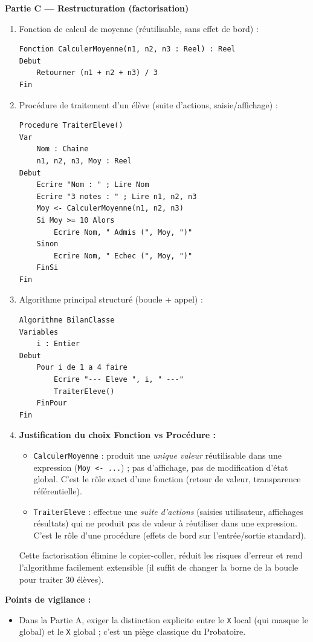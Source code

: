 \documentclass[11pt]{article}
\newcommand{\cle}[1]{{\popxbold\color{popdark}#1}}
\begin{document}
\begin{corrige}
\textbf{Partie C — Restructuration (factorisation)}
\begin{enumerate}
    \item Fonction de calcul de moyenne (réutilisable, sans effet de bord) :
\begin{lstlisting}
Fonction CalculerMoyenne(n1, n2, n3 : Reel) : Reel
Debut
    Retourner (n1 + n2 + n3) / 3
Fin
\end{lstlisting}
    \item Procédure de traitement d'un élève (suite d'actions, saisie/affichage) :
\begin{lstlisting}
Procedure TraiterEleve()
Var
    Nom : Chaine
    n1, n2, n3, Moy : Reel
Debut
    Ecrire "Nom : " ; Lire Nom
    Ecrire "3 notes : " ; Lire n1, n2, n3
    Moy <- CalculerMoyenne(n1, n2, n3)
    Si Moy >= 10 Alors
        Ecrire Nom, " Admis (", Moy, ")"
    Sinon
        Ecrire Nom, " Echec (", Moy, ")"
    FinSi
Fin
\end{lstlisting}
    \item Algorithme principal structuré (boucle + appel) :
\begin{lstlisting}
Algorithme BilanClasse
Variables
    i : Entier
Debut
    Pour i de 1 a 4 faire
        Ecrire "--- Eleve ", i, " ---"
        TraiterEleve()
    FinPour
Fin
\end{lstlisting}
    \item \textbf{Justification du choix Fonction vs Procédure :}
    \begin{itemize}
        \item \texttt{CalculerMoyenne} : produit une \emph{unique valeur} réutilisable dans une expression (\texttt{Moy <- ...}) ; pas d'affichage, pas de modification d'état global. C'est le rôle exact d'une \cle{fonction} (retour de valeur, transparence référentielle).
        \item \texttt{TraiterEleve} : effectue une \emph{suite d'actions} (saisies utilisateur, affichages résultats) qui ne produit pas de valeur à réutiliser dans une expression. C'est le rôle d'une \cle{procédure} (effets de bord sur l'entrée/sortie standard).
    \end{itemize}
    Cette factorisation élimine le copier-coller, réduit les risques d'erreur et rend l'algorithme facilement extensible (il suffit de changer la borne de la boucle pour traiter 30 élèves).
\end{enumerate}
\textbf{Points de vigilance :}
\begin{itemize}
    \item Dans la Partie A, exiger la distinction explicite entre le \texttt{X} local (qui masque le global) et le \texttt{X} global ; c'est un piège classique du Probatoire.

\end{itemize}
\end{corrige}
\end{document}
